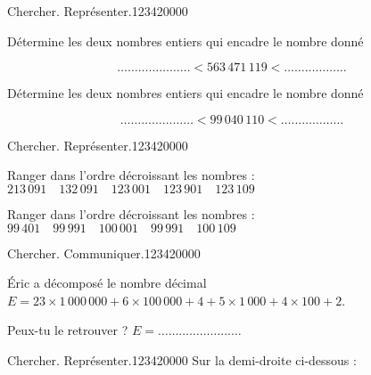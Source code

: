  
\begin{pageParcourst}


\begin{ExoCt}{Chercher. Représenter.}{1234}{2}{0}{0}{0}{0}

Détermine les deux nombres entiers qui encadre le nombre donné  \vspace{0.1cm}

$$\ldots\ldots\ldots\ldots\ldots\ldots\ldots < 563\,471\,119< \ldots\ldots\ldots\ldots\ldots\ldots$$

Détermine les deux nombres entiers qui encadre le nombre donné  \vspace{0.1cm}

$$\ldots\ldots\ldots\ldots\ldots\ldots\ldots < 99\,040\,110< \ldots\ldots\ldots\ldots\ldots\ldots$$
 
\end{ExoCt}

\begin{ExoCt}{Chercher. Représenter.}{1234}{2}{0}{0}{0}{0}

Ranger dans l'ordre décroissant les nombres : $ 213\,091 \quad 132\,091 \quad 123\,001 \quad 123\,901\quad 123\,109$ \vspace{0.2cm}
  \vspace{0.1cm}

Ranger dans l'ordre décroissant les nombres : $ 99\,401 \quad 99\,991 \quad 100\,001 \quad 99\,991\quad 100\,109$ \vspace{0.1cm}

 
\end{ExoCt}


\begin{ExoCt}{Chercher. Communiquer.}{1234}{2}{0}{0}{0}{0}
 
Éric a décomposé le nombre décimal  $E = 23\times 1\,000\,000 + 6\times 100\,000 + 4 +  5\times 1\,000  + 4\times 100 +  2$. \vspace{0.2cm}

Peux-tu le retrouver ? $E = \ldots\ldots\ldots\ldots\ldots\ldots\ldots\ldots $
\end{ExoCt}

\begin{ExoCt}{Chercher. Représenter.}{1234}{2}{0}{0}{0}{0}
 Sur la demi-droite ci-dessous :


\end{ExoCt}
\end{pageParcourst}
